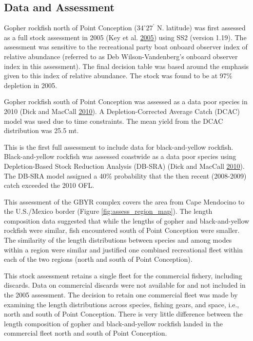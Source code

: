 \documentclass[12pt,]{article}
\begin{document}
\FloatBarrier

\newpage

\subsection*{Data and Assessment}\label{data-and-assessment}

Gopher rockfish north of Point Conception (\(34^\circ 27^\prime\) N.
latitude) was first assessed as a full stock assessment in 2005 (Key et
al. \protect\hyperlink{ref-Key2005}{2005}) using SS2 (version 1.19). The
assessment was sensitive to the recreational party boat onboard observer
index of relative abundance (referred to as Deb Wilson-Vandenberg's
onboard observer index in this assessment). The final decision table was
based around the emphasis given to this index of relative abundance. The
stock was found to be at 97\% depletion in 2005.

Gopher rockfish south of Point Conception was assessed as a data poor
species in 2010 (Dick and MacCall
\protect\hyperlink{ref-Dick2010}{2010}). A Depletion-Corrected Average
Catch (DCAC) model was used due to time constraints. The mean yield from
the DCAC distribution was 25.5 mt.

This is the first full assessment to include data for black-and-yellow
rockfish. Black-and-yellow rockfish was assessed coastwide as a data
poor species using Depletion-Based Stock Reduction Analysis (DB-SRA)
(Dick and MacCall \protect\hyperlink{ref-Dick2010}{2010}). The DB-SRA
model assigned a 40\% probability that the then recent (2008-2009) catch
exceeded the 2010 OFL.

This assessment of the GBYR complex covers the area from Cape Mendocino
to the U.S./Mexico border (Figure \ref{fig:assess_region_map}). The
length composition data suggested that while the lengths of gopher and
black-and-yellow rockfish were similar, fish encountered south of Point
Conception were smaller. The similarity of the length distributions
between species and among modes within a region were similar and
justified one combined recreational fleet within each of the two regions
(north and south of Point Conception).

This stock assessment retains a single fleet for the commercial fishery,
including discards. Data on commercial discards were not available for
and not included in the 2005 assessment. The decision to retain one
commercial fleet was made by examining the length distributions across
species, fishing gears, and space, i.e., north and south of Point
Conception. There is very little difference between the length
composition of gopher and black-and-yellow rockfish landed in the
commercial fleet north and south of Point Conception.
\end{document}
